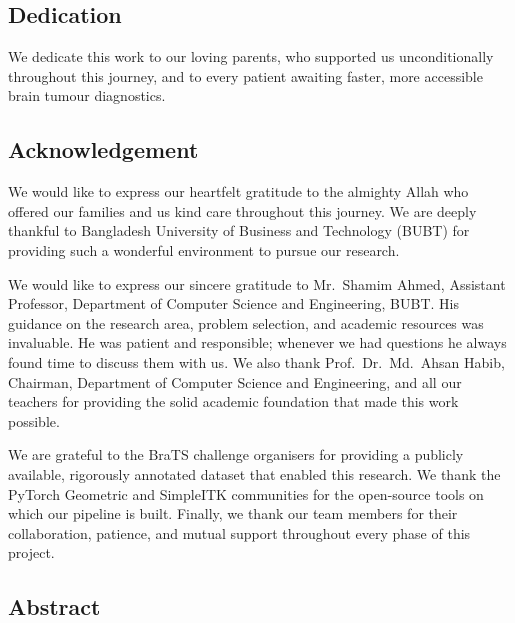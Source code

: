 \documentclass{article}
\begin{document}
\begin{center}
    \section*{Dedication}
\end{center}
We dedicate this work to our loving parents, who supported us
unconditionally throughout this journey, and to every patient
awaiting faster, more accessible brain tumour diagnostics.
\cleardoublepage

\begin{center}
    \section*{Acknowledgement}
\end{center}
\large We would like to express our heartfelt gratitude to the almighty Allah
who offered our families and us kind care throughout this journey. We are deeply
thankful to Bangladesh University of Business and Technology (BUBT) for providing
such a wonderful environment to pursue our research.

We would like to express our sincere gratitude to Mr.\ Shamim Ahmed, Assistant
Professor, Department of Computer Science and Engineering, BUBT. His guidance on
the research area, problem selection, and academic resources was invaluable. He was
patient and responsible; whenever we had questions he always found time to discuss
them with us. We also thank Prof.\ Dr.\ Md.\ Ahsan Habib, Chairman,
Department of Computer Science and Engineering, and all our teachers for providing
the solid academic foundation that made this work possible.

We are grateful to the BraTS challenge organisers for providing a publicly available,
rigorously annotated dataset that enabled this research. We thank the PyTorch Geometric
and SimpleITK communities for the open-source tools on which our pipeline is built.
Finally, we thank our team members for their collaboration, patience, and mutual
support throughout every phase of this project.
\cleardoublepage

\begin{center}
    \section*{Abstract}
\end{center}
\end{document}
